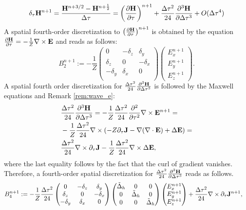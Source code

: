 \documentclass[12pt,reqno]{amsart}
\newcommand{\e}{{\bf E}}
\newcommand{\h}{{\bf H}}
\newcommand{\J}{{\bf J}}
\theoremstyle{definition}
\numberwithin{equation}{section}
\begin{document}
   \begin{equation}\label{eq:next_term}
   	\delta_\tau \h^{n+1}=\frac{\h^{n+3/2}-\h^{n+\frac{1}{2} } }{\Delta \tau}=
   	\left (\frac{\partial \h}{\partial \tau}\right)^{n+1}+
   	\frac{\Delta \tau^2}{24}\frac{\partial^3\h}{\partial \Delta \tau^3}+
   	O(\Delta \tau ^4)
   \end{equation}
A spatial fourth-order discretization to $  \left (\frac{\partial \h}{\partial \tau}\right)^{n+1}$
is obtained by the equation $\frac{\partial \h}{\partial \tau}=-\frac{1}{Z}\nabla \times \e$ and reads as follows:
\begin{equation}
	B_2^{n+1}:=
   	-\frac{1}{Z}	\begin{pmatrix}
   		0& -\delta_z & \delta _y\\
   		\delta_z&0&-\delta_x\\
   		-\delta_y&\delta_x&0\\
   	\end{pmatrix}
   	\begin{pmatrix}
   		E_x^{n+1}\\
   		E_y^{n+1}\\
   		E_z^{n+1}
   	\end{pmatrix}.
   \end{equation}
A spatial fourth order discretization for $\frac{\Delta \tau^2}{24}\frac{\partial^3\h}{\partial \Delta \tau^3}$ is followed by the Maxwell equations and Remark \ref{rem:wave_e}:
	\begin{align*}
	&
	\frac{\Delta \tau^2}{24}\frac{\partial^3\h}{\partial \Delta \tau^3}=
	-\frac{1}{Z}\frac{\Delta \tau^2}{24}\frac{\partial^2}{\partial  \tau^2}\nabla \times \e^{n+1}=\\&
	-\frac{1}{Z}\frac{\Delta \tau^2}{24}\nabla \times (-Z\partial_{\tau}\J-\nabla(\nabla \cdot \e)+\Delta \e)=\\&
	\frac{\Delta \tau^2}{24}\nabla\times \partial_{\tau}\J
	-\frac{1}{Z}\frac{\Delta \tau^2}{24}\nabla\times \Delta \e,
\end{align*}
where the last equality follows by the fact that the curl of gradient vanishes.
Therefore, a fourth-order spatial discretization for $\frac{\Delta \tau^2}{24}\frac{\partial^3\h}{\partial \Delta \tau^3}$ reads as follows.
\begin{align*}
	&
	B_4^{n+1}:=
	-\frac{1}{Z}\frac{\Delta \tau^2}{24}
	\begin{pmatrix}
		0& -\delta_z & \delta _y\\
		\delta_z&0&-\delta_x\\
		-\delta_y&\delta_x&0\\
	\end{pmatrix}
	\begin{pmatrix}
	\tilde{\Delta}_h& 0 & 0\\
0	&\tilde{\Delta}_h&0\\
	0&0&\tilde{\Delta}_h\\
\end{pmatrix}
	\begin{pmatrix}
		E_x^{n+1}\\
		E_y^{n+1}\\
		E_z^{n+1}
	\end{pmatrix}
+\frac{\Delta \tau^2}{24}\nabla \times \partial_{\tau}\J^{n+1},
\end{align*}
\end{document}
